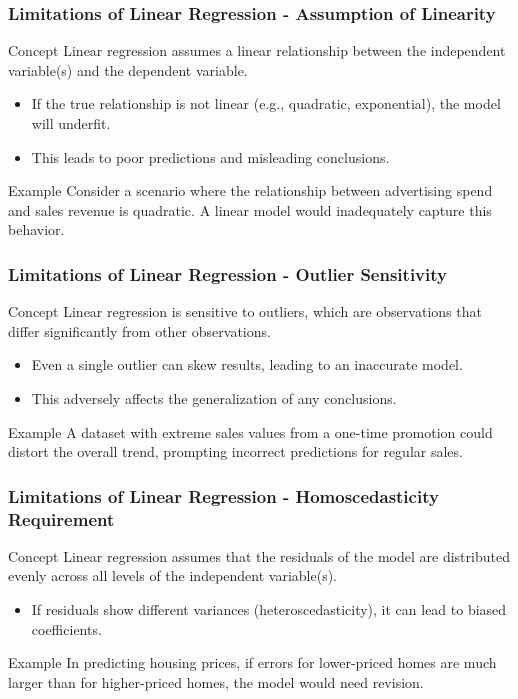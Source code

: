 \documentclass{beamer}
\begin{document}
\begin{frame}[fragile]
    \frametitle{Limitations of Linear Regression - Assumption of Linearity}
    \begin{block}{Concept}
        Linear regression assumes a linear relationship between the independent variable(s) and the dependent variable.
    \end{block}
    \begin{itemize}
        \item If the true relationship is not linear (e.g., quadratic, exponential), the model will underfit.
        \item This leads to poor predictions and misleading conclusions.
    \end{itemize}
    \begin{block}{Example}
        Consider a scenario where the relationship between advertising spend and sales revenue is quadratic. A linear model would inadequately capture this behavior.
    \end{block}
\end{frame}

\begin{frame}[fragile]
    \frametitle{Limitations of Linear Regression - Outlier Sensitivity}
    \begin{block}{Concept}
        Linear regression is sensitive to outliers, which are observations that differ significantly from other observations.
    \end{block}
    \begin{itemize}
        \item Even a single outlier can skew results, leading to an inaccurate model.
        \item This adversely affects the generalization of any conclusions.
    \end{itemize}
    \begin{block}{Example}
        A dataset with extreme sales values from a one-time promotion could distort the overall trend, prompting incorrect predictions for regular sales.
    \end{block}
\end{frame}

\begin{frame}[fragile]
    \frametitle{Limitations of Linear Regression - Homoscedasticity Requirement}
    \begin{block}{Concept}
        Linear regression assumes that the residuals of the model are distributed evenly across all levels of the independent variable(s).
    \end{block}
    \begin{itemize}
        \item If residuals show different variances (heteroscedasticity), it can lead to biased coefficients.
    \end{itemize}
    \begin{block}{Example}
        In predicting housing prices, if errors for lower-priced homes are much larger than for higher-priced homes, the model would need revision.
    \end{block}
\end{frame}
\end{document}
